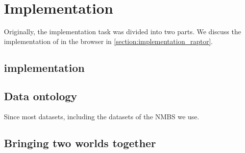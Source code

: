 \chapter{Implementation}
\label{chap:implementation}

Originally, the implementation task was divided into two parts. We discuss the implementation of  in the browser in \autoref{section:implementation_raptor}.


\section{ implementation}\label{section:implementation_raptor}
\section{Data ontology}
Since most datasets, including the datasets of the NMBS we use. 
\section{Bringing two worlds together}